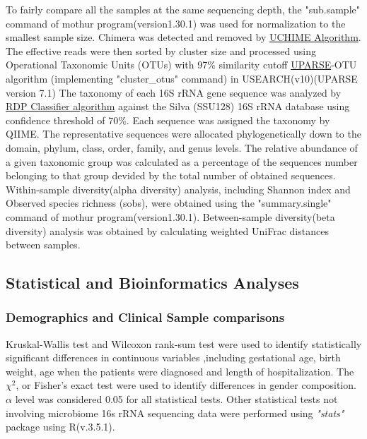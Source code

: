 \documentclass[fleqn,10pt]{wlpeerj} %
\begin{document}
  \noindent
  To fairly compare all the samples at the same sequencing depth, the "sub.sample" command of mothur program(version1.30.1)\citep{schloss2009introducing} was used for normalization to the smallest sample size. Chimera was detected and removed by \href{https://www.drive5.com/usearch/manual/uchime_algo.html}{UCHIME Algorithm}. The effective reads were then sorted by cluster size and processed using Operational Taxonomic Units (OTUs) with 97\% similarity cutoff \href{http://drive5.com/uparse/}{UPARSE}-OTU algorithm (implementing "cluster\_otus" command)\citep{edgar2013uparse} in USEARCH(v10)(UPARSE version 7.1) The taxonomy of each 16S rRNA gene sequence was analyzed by \href{http://rdp.cme.msu.edu/}{RDP Classifier algorithm}\citep{wang2007naive} against the Silva (SSU128)\citep{quast2012silva} 16S rRNA database using confidence threshold of 70\%. Each sequence was assigned the taxonomy by QIIME\citep{caporaso2010qiime}. The representative sequences were allocated phylogenetically down to the domain, phylum, class, order, family, and genus levels. The relative abundance of a given taxonomic group was calculated as a percentage of the sequences number belonging to that group devided by the total number of obtained sequences.\\

  \noindent
   Within-sample diversity(alpha diversity) analysis, including Shannon index and Observed species richness (sobs), were obtained using the "summary.single" command of mothur program(version1.30.1)\citep{schloss2009introducing}. Between-sample diversity(beta diversity) analysis was obtained by calculating weighted UniFrac distances between samples.

  \subsection*{Statistical and Bioinformatics Analyses}
    \subsubsection*{Demographics and Clinical Sample comparisons}
    Kruskal-Wallis test and Wilcoxon rank-sum test were used to identify statistically significant differences in continuous variables ,including gestational age, birth weight, age when the patients were diagnosed and length of hospitalization. The $\chi^2$, or Fisher's exact test were used to identify differences in gender composition. $\alpha$ level was considered 0.05 for all statistical tests. Other statistical tests not involving microbiome 16s rRNA sequencing data were performed using \textit{"stats"} package using R(v.3.5.1).
\end{document}
